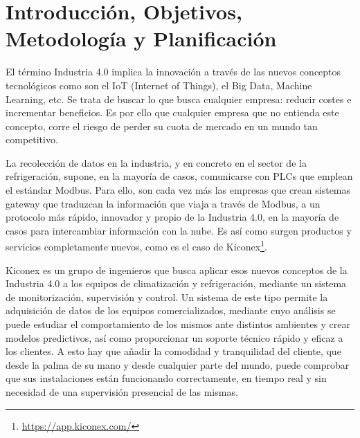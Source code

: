 
\cleardoublepage
\chapter*{Introducción, Objetivos, Metodología y Planificación}

\label{chap:intro} %




El término Industria 4.0 implica la innovación a través de las nuevos conceptos tecnológicos como son el IoT (Internet of Things), el Big Data, Machine Learning, etc. Se trata de buscar lo que busca cualquier empresa: reducir costes e incrementar beneficios. Es por ello que cualquier empresa que no entienda este concepto, corre el riesgo de perder su cuota de mercado en un mundo tan competitivo.

La recolección de datos en la industria, y en concreto en el sector de la refrigeración, supone, en la mayoría de casos, comunicarse con PLCs que emplean el estándar Modbus. Para ello, son cada vez más las empresas que crean sistemas gateway que traduzcan la información que viaja a través de Modbus, a un protocolo más rápido, innovador y propio de la Industria 4.0, en la mayoría de casos para intercambiar información con la nube. Es así como surgen productos y servicios completamente nuevos, como es el caso de Kiconex\footnote{\url{https://app.kiconex.com/}}.

Kiconex es un grupo de ingenieros que busca aplicar esos nuevos conceptos de la Industria 4.0 a los equipos de climatización y refrigeración, mediante un sistema de monitorización, supervisión y control. Un sistema de este tipo permite la adquisición de datos de los equipos comercializados, mediante cuyo análisis se puede estudiar el comportamiento de los mismos ante distintos ambientes y crear modelos predictivos, así como proporcionar un soporte técnico rápido y eficaz a los clientes. A esto hay que añadir la comodidad y tranquilidad del cliente, que desde la palma de su mano y desde cualquier parte del mundo, puede comprobar que sus instalaciones están funcionando correctamente, en tiempo real y sin necesidad de una supervisión presencial de las mismas.

